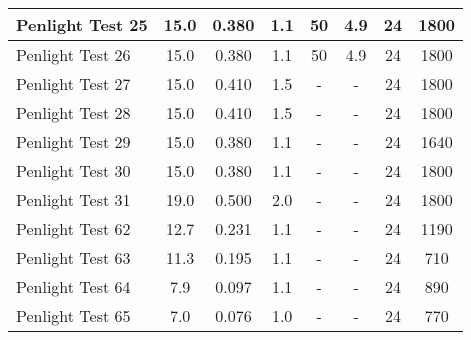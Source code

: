 \begin{table}[!ht]
\begin{center}
\begin{tabular}{|l|c|c|c|c|c|c|c|}
Penlight Test 25  &  15.0      &  0.380        &  1.1        &  50        &  4.9        &  24           &  1800       \\ \hline
Penlight Test 26  &  15.0      &  0.380        &  1.1        &  50        &  4.9        &  24           &  1800       \\ \hline
Penlight Test 27  &  15.0      &  0.410        &  1.5        &  -         &  -          &  24           &  1800       \\ \hline
Penlight Test 28  &  15.0      &  0.410        &  1.5        &  -         &  -          &  24           &  1800       \\ \hline
Penlight Test 29  &  15.0      &  0.380        &  1.1        &  -         &  -          &  24           &  1640       \\ \hline
Penlight Test 30  &  15.0      &  0.380        &  1.1        &  -         &  -          &  24           &  1800       \\ \hline
Penlight Test 31  &  19.0      &  0.500        &  2.0        &  -         &  -          &  24           &  1800       \\ \hline
Penlight Test 62  &  12.7      &  0.231        &  1.1        &  -         &  -          &  24           &  1190       \\ \hline
Penlight Test 63  &  11.3      &  0.195        &  1.1        &  -         &  -          &  24           &  710        \\ \hline
Penlight Test 64  &   7.9      &  0.097        &  1.1        &  -         &  -          &  24           &  890        \\ \hline
Penlight Test 65  &   7.0      &  0.076        &  1.0        &  -         &  -          &  24           &  770        \\ \hline
\end{tabular}
\end{center}
\end{table}


\clearpage


